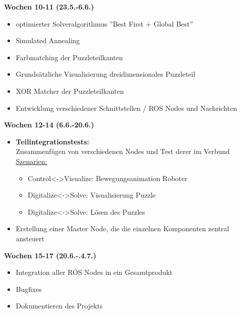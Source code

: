 \noindent\textbf{Wochen 10-11 (23.5.-6.6.)} 
\begin{itemize}
    \item optimierter Solveralgorithmus ”Best First + Global Best”
    \item Simulated Annealing
    \item Farbmatching der Puzzleteilkanten
    \item Grundsätzliche Visualisierung dreidimensionales Puzzleteil
    \item XOR Matcher der Puzzleteilkanten
    \item Entwicklung verschiedener Schnittstellen / ROS Nodes und Nachrichten
\end{itemize}

\noindent\textbf{Wochen 12-14 (6.6.-20.6.)} 
\begin{itemize}
   \item \textbf{Teilintegrationstests:} \\Zusammenfügen von verschiedenen Nodes und Test derer im Verbund \\ \underline{Szenarien:}
\begin{itemize}
\item Control\textless-\textgreater  Visualize: Bewegungsanimation Roboter
\item Digitalize\textless-\textgreater  Solve: Visualisierung Puzzle
\item Digitalize\textless-\textgreater  Solve: Lösen des Puzzles
\end{itemize}
\item Erstellung einer Master Node, die die einzelnen Komponenten zentral ansteuert
\end{itemize}

\noindent\textbf{Wochen 15-17 (20.6.-.4.7.)} 
\begin{itemize}
\item Integration aller ROS Nodes in ein Gesamtprodukt
\item Bugfixes
\item Dokumentieren des Projekts
\end{itemize}